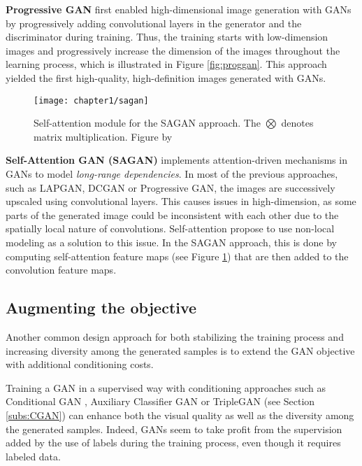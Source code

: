 \textbf{Progressive GAN} \citep{Karras2017} first enabled high-dimensional image generation with GANs by progressively adding convolutional layers in the generator and the discriminator during training. Thus, the training starts with low-dimension images and progressively increase the dimension of the images throughout the learning process, which is illustrated in Figure \ref{fig:proggan}. This approach yielded the first high-quality, high-definition images generated with \ac{GANs}.

\begin{figure}
	\centering
	\texttt{[image: chapter1/sagan]}
	\caption[Self-attention module]{Self-attention module for the SAGAN approach. The $\bigotimes$ denotes matrix multiplication. Figure by \citet{Zhang2018}}
	\label{fig:sagan}
\end{figure}

\textbf{Self-Attention GAN (SAGAN)} \citep{Zhang2018} implements attention-driven  mechanisms in \ac{GANs} to model \textit{long-range dependencies}. In most of the previous approaches, such as LAPGAN, DCGAN or Progressive GAN, the images are successively upscaled using convolutional layers. This causes issues in high-dimension, as some parts of the generated image could be inconsistent with each other due to the spatially local nature of convolutions. Self-attention propose to use non-local modeling as a solution to this issue. In the SAGAN approach, this is done by computing self-attention feature maps (see Figure \ref{fig:sagan}) that are then added to the convolution feature maps. 

\subsection{Augmenting the objective}
\label{subs:augmented_objectives}

Another common design approach for both stabilizing the training process and increasing diversity among the generated samples is to extend the \ac{GAN} objective with additional conditioning costs.

Training a \ac{GAN} in a supervised way with conditioning approaches such as Conditional GAN \citep{Mirza2014}, Auxiliary Classifier GAN \citep{Odena2016} or TripleGAN \citep{Li2017} (see Section \ref{subs:CGAN}) can enhance both the visual quality as well as the diversity among the generated samples. Indeed, GANs seem to take profit from the supervision added by the use of labels during the training process, even though it requires labeled data.

